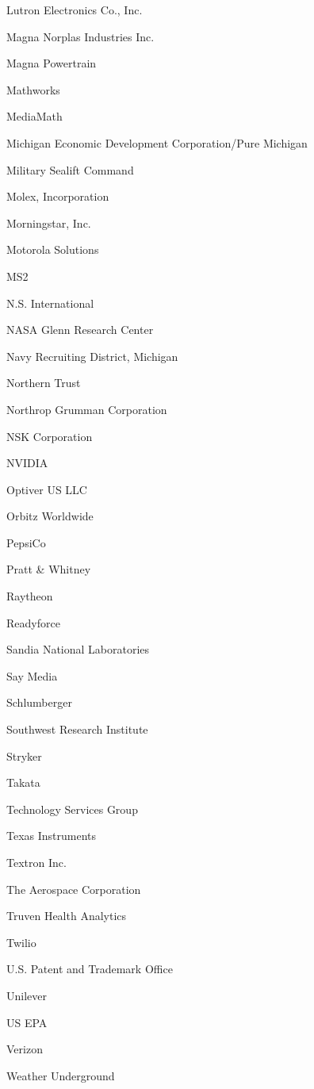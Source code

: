 \documentclass[twoside]{article}
\begin{document}
\begin{center}
\begin{multicols}{5}
\begin{FlushLeft}
\begin{compactitem}
\item Lutron Electronics Co., Inc.
\item Magna Norplas Industries Inc.
\item Magna Powertrain
\item Mathworks
\item MediaMath
\item Michigan Economic Development Corporation/Pure Michigan
\item Military Sealift Command
\item Molex, Incorporation
\item Morningstar, Inc.
\item Motorola Solutions
\item MS2
\item N.S. International
\item NASA Glenn Research Center
\item Navy Recruiting District, Michigan
\item Northern Trust
\item Northrop Grumman Corporation
\item NSK Corporation
\item NVIDIA
\item Optiver US LLC
\item Orbitz Worldwide
\item PepsiCo
\item Pratt \& Whitney
\item Raytheon
\item Readyforce
\item Sandia National Laboratories
\item Say Media
\item Schlumberger
\item Southwest Research Institute
\item Stryker
\item Takata
\item Technology Services Group
\item Texas Instruments
\item Textron Inc.
\item The Aerospace Corporation
\item Truven Health Analytics
\item Twilio
\item U.S. Patent and Trademark Office
\item Unilever
\item US EPA
\item Verizon
\item Weather Underground

\end{compactitem}
\end{FlushLeft}
\end{multicols}
\end{center}
\end{document}
